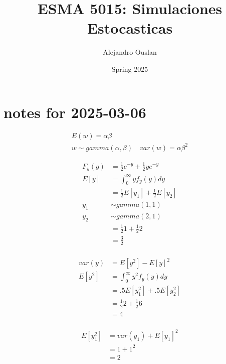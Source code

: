 \documentclass[10pt, oneside]{article}
\title{ESMA 5015: Simulaciones Estocasticas}
\author{Alejandro Ouslan}
\date{Spring 2025}
\begin{document}
\maketitle
\tableofcontents

\vspace{.25in}

\section{notes for 2025-03-06}

\[
	\begin{split}
		E(w) = \alpha \beta \\
		w\sim gamma(\alpha, \beta) \quad var(w) = \alpha \beta^2
	\end{split}
\]


\[
	\begin{split}
		F_y (g) & = \frac{1}{2} e^{-y} + \frac{1}{2} y e^{-y} \\
		E[y]    & = \int_0^\infty y f_y(y) dy                 \\
		        & = \frac{1}{2} E[y_1] + \frac{1}{2} E[y_2]   \\
		y_1     & \sim gamma(1,1)                             \\
		y_2     & \sim gamma(2,1)                             \\
		        & = \frac{1}{2} 1 + \frac{1}{2} 2             \\
		        & = \frac{3}{2}                               \\
	\end{split}
\]


\[
	\begin{split}
		var (y) & = E[y^2] - E[y]^2               \\
		E[y^2]  & = \int_0^\infty y^2 f_y(y) dy   \\
		        & = .5 E[y_1^2] + .5 E[y_2^2]     \\
		        & = \frac{1}{2} 2 + \frac{1}{2} 6 \\
		        & = 4                             \\
	\end{split}
\]

\[
	\begin{split}
		E[y_1^2] & = var(y_1) + E[y_1]^2 \\
		         & = 1 + 1^2             \\
		         & = 2
	\end{split}
\]
\end{document}
